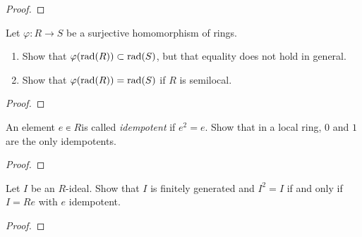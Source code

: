 \begin{proof}
\end{proof}
\newpage
\begin{problem}
Let $\varphi\colon R\to S$ be a surjective homomorphism of
rings.
\begin{enumerate}[noitemsep,label=(\alph*)]
\item Show that $\varphi(\mathrm{rad}(R))\subset\mathrm{rad}(S)$, but that
  equality does not hold in general.
\item Show that $\varphi(\mathrm{rad}(R))=\mathrm{rad}(S)$ if $R$ is semilocal.
\end{enumerate}
\end{problem}
\begin{proof}
\end{proof}
\newpage
\begin{problem}
An element $e\smallin R$is called \emph{idempotent} if $e^2=e$. Show
that in a local ring, $0$ and $1$ are the only idempotents.
\end{problem}
\begin{proof}
\end{proof}
\newpage
\begin{problem}
Let $I$ be an $R$-ideal. Show that $I$ is finitely generated and
$I^2=I$ if and only if $I=Re$ with $e$ idempotent.
\end{problem}
\begin{proof}
\end{proof}

